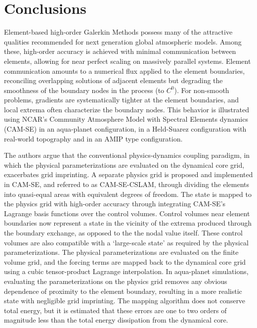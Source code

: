 \documentclass{ametsoc}
\begin{document}
{\section{Conclusions}\label{sec:conclusions}

Element-based high-order Galerkin Methods possess many of the attractive qualities recommended for next generation global atmospheric models. Among these, high-order accuracy is achieved with minimal communication between elements, allowing for near perfect scaling on massively parallel systems. Element communication amounts to a numerical flux applied to the element boundaries, reconciling overlapping solutions of adjacent elements but degrading the smoothness of the boundary nodes in the process (to $C^0$). For non-smooth problems, gradients are systematically tighter at the element boundaries, and local extrema often characterize the boundary nodes. This behavior is illustrated using NCAR's Community Atmosphere Model with Spectral Elements dynamics (CAM-SE) in an aqua-planet configuration, in a Held-Suarez configuration with real-world topography and in an AMIP type configuration.

The authors argue that the conventional physics-dynamics coupling paradigm, in which the physical parameterizations are evaluated on the dynamical core grid, exacerbates grid imprinting. A separate physics grid is proposed and implemented in CAM-SE, and referred to as CAM-SE-CSLAM, through dividing the elements into quasi-equal areas with equivalent degrees of freedom. The state is mapped to the physics grid with high-order accuracy through integrating CAM-SE's Lagrange basis functions over the control volumes. Control volumes near element boundaries now represent a state in the vicinity of the extrema produced through the boundary exchange, as opposed to the the nodal value itself. These control volumes are also compatible with a `large-scale state' as required by the physical parameterizations. The physical parameterizations are evaluated on the finite volume grid, and the forcing terms are mapped back to the dynamical core grid using a cubic tensor-product Lagrange interpolation. In aqua-planet simulations, evaluating the parameterizations on the physics grid removes any obvious dependence of proximity to the element boundary, resulting in a more realistic state with negligible grid imprinting. The mapping algorithm does not conserve total energy, but it is estimated that these errors are one to two orders of magnitude less than the total energy dissipation from the dynamical core.

}
\end{document}

